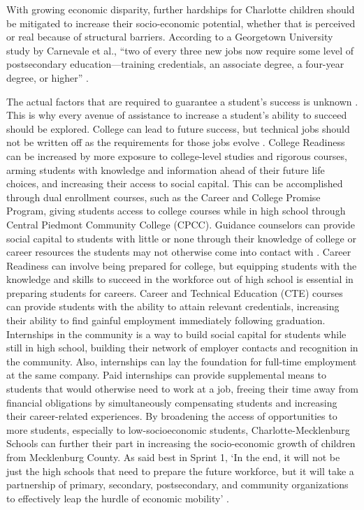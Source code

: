 With growing economic disparity, further hardships for Charlotte children should be mitigated to increase their socio-economic potential, whether that is perceived or real because of structural barriers. According to a Georgetown University study by Carnevale et al., “two of every three new jobs now require some level of postsecondary education—training credentials, an associate degree, a four-year degree, or higher” \parencite[as cited in][p. 26]{LOO}.

The actual factors that are required to guarantee a student's success is unknown \parencite[][p. 27]{LOO}. 
This is why every avenue of assistance to increase a student's ability to succeed should be explored. 
College can lead to future success, but technical jobs should not be written off as the requirements for those jobs evolve \parencite[][p. 27]{LOO}. 
College Readiness can be increased by more exposure to college-level studies and rigorous courses, arming students with knowledge and information ahead of their future life choices, and increasing their access to social capital. 
This can be accomplished through dual enrollment courses, such as the Career and College Promise Program, giving students access to college courses while in high school through Central Piedmont Community College (CPCC).
Guidance counselors can provide social capital to students with little or none  through their knowledge of college or career resources the students may not otherwise come into contact with \parencite{tang2019high}.
Career Readiness can involve being prepared for college, but equipping students with the knowledge and skills to succeed in the workforce out of high school is essential in preparing students for careers. 
Career and Technical Education (CTE) courses can provide students with the ability to attain relevant credentials, increasing their ability to find gainful employment immediately following graduation. Internships in the community is a way to build social capital for students while still in high school, building their network of employer contacts and recognition in the community. Also, internships can lay the foundation for full-time employment at the same company. 
Paid internships can provide supplemental means to students that would otherwise need to work at a job, freeing their time away from financial obligations by simultaneously compensating students and increasing their career-related experiences. 
By broadening the access of opportunities to more students, especially to low-socioeconomic students, Charlotte-Mecklenburg Schools can further their part in increasing the socio-economic growth of children from Mecklenburg County. 
As said best in Sprint 1, `In the end, it will not be just the high schools that need to prepare the future workforce, but it will take a partnership of primary, secondary, postsecondary, and community organizations to effectively leap the hurdle of economic mobility' \parencite[][p. 2]{sprint1}.